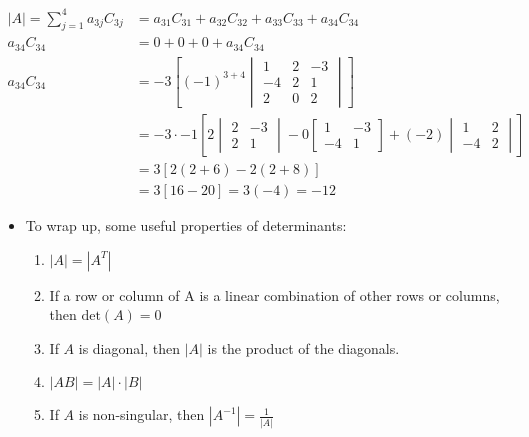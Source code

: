 \begin{itemize}
\begin{itemize}
        \begin{align*}
            |A| = \sum_{j=1}^4 a_{3j}C_{3j} & = a_{31}C_{31} + a_{32}C_{32} + a_{33}C_{33} + a_{34}C_{34} \\
            a_{34}C_{34} & = 0 + 0 + 0 + a_{34}C_{34} \\
            a_{34}C_{34} & = -3\left[(-1)^{3+4}
            \begin{vmatrix}
                1 & 2 & -3 \\
                -4 & 2 & 1 \\
                2 & 0 & 2
            \end{vmatrix}  
            \right] \\ 
            & = -3 \cdot -1 \left[2 
            \begin{vmatrix}
                2 & -3 \\
                2 & 1    
            \end{vmatrix} - 0 
            \begin{bmatrix}
                1 & -3 \\
                -4 & 1
            \end{bmatrix} + (-2)
            \begin{vmatrix}
                1 & 2 \\
                -4 & 2
            \end{vmatrix}
            \right] \\
            & = 3 \left[2(2 + 6) - 2(2+8) \right] \\
            & = 3[16 - 20] = 3(-4) = -12
        \end{align*}
    \end{itemize}
\end{itemize}

\begin{itemize}
    \item To wrap up, some useful properties of determinants:
    \begin{enumerate}
        \item $|A| = |A^T|$
        \item If a row or column of A is a linear combination of other rows or columns, then $\text{det}(A) = 0$
        \item If $A$ is diagonal, then $|A|$ is the product of the diagonals.
        \item $|AB| = |A| \cdot |B|$
        \item If $A$ is non-singular, then $|A^{-1}| = \frac{1}{|A|}$
    \end{enumerate}
\end{itemize}

